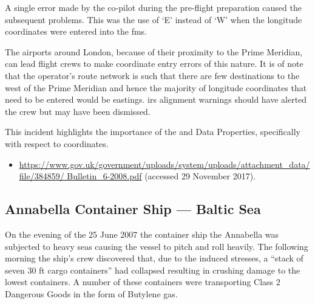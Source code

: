 A single error made by the co-pilot during the pre-flight preparation caused the subsequent problems. This was the use of `E' instead of `W' when the longitude coordinates were entered into the \gls{fms}.

The airports around London, because of their proximity to the Prime Meridian, can lead flight crews to make coordinate entry errors of this nature. It is of note that the operator's route network is such that there are few destinations to the west of the Prime Meridian and hence the majority of longitude coordinates that need to be entered would be eastings. \gls{irs} alignment warnings should have alerted the crew but may have been dismissed.

This incident highlights the importance of the  and  Data Properties, specifically with respect to coordinates.

\begin{samepage}
\begin{itemize}
  \item \raggedright{\href{https://www.gov.uk/government/uploads/system/uploads/attachment_data/file/384859/Bulletin_6-2008.pdf}{https://www.gov.uk/government/uploads/system/uploads/attachment\_data/file/384859/ Bulletin\_6-2008.pdf} (accessed 29 November 2017).}
\end{itemize}
\end{samepage}

\subsection{Annabella Container Ship --- Baltic Sea} \label{bkm:incacc:annabella}
On the evening of the 25 June 2007 the container ship the Annabella was subjected to heavy seas causing the vessel to pitch and roll heavily. The following morning the ship’s crew discovered that, due to the induced stresses, a ``stack of seven 30 ft cargo containers'' had collapsed resulting in crushing damage to the lowest containers. A number of these containers were transporting Class 2 Dangerous Goods in the form of Butylene gas.
 
